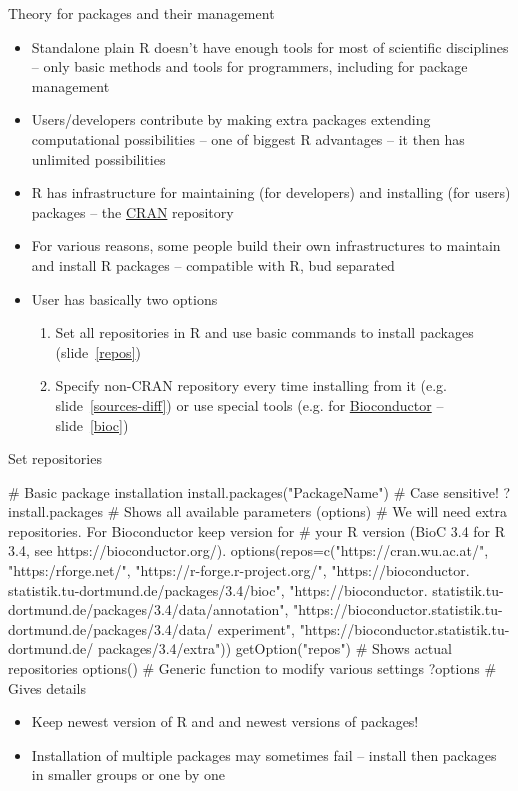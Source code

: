 \documentclass[compress, ucs, xelatex, 11pt, xcolor=svgnames,
  hyperref={
    bookmarks=true,
    unicode=true,
    colorlinks=true,
    pdftitle={Molecular data in R},
    plainpages=false,
    pdfauthor={Vojtech Zeisek},
    pdfsubject={Course about phylogeny and evolution in R},
    pdfcreator={XeLaTeX},
    pdfkeywords={R, evolution, phylogeny, molecular data},
    linkcolor=Tomato,
    anchorcolor=SaddleBrown,
    citecolor=Goldenrod,
    filecolor=DarkMagenta,
    menucolor=Sienna,
    urlcolor=DarkTurquoise,
    pdftex},
  url={hyphens, lowtilde} %
  ]{beamer}
\begin{document}
\begin{frame}{Theory for packages and their management}
  \begin{itemize}
    \item Standalone plain R doesn't have enough tools for most of scientific disciplines -- only basic methods and tools for programmers, including for package management
    \item Users/developers contribute by making extra packages extending computational possibilities -- one of biggest R advantages -- it then has unlimited possibilities
    \item R has infrastructure for maintaining (for developers) and installing (for users) packages -- the \href{https://cran.r-project.org/}{CRAN} repository
    \item For various reasons, some people build their own infrastructures to maintain and install R packages -- compatible with R, bud separated
    \item User has basically two options
    \begin{enumerate}
      \item Set all repositories in R and use basic commands to install packages (slide~\ref{repos})
      \item Specify non-CRAN repository every time installing from it (e.g. slide~\ref{sources-diff}) or use special tools (e.g. for \href{http://bioconductor.org/install/}{Bioconductor} -- slide~\ref{bioc})
    \end{enumerate}
  \end{itemize}
\end{frame}

\begin{frame}[fragile]{Set repositories}
  \label{repos}
  \begin{spluscode}
    # Basic package installation
    install.packages("PackageName") # Case sensitive!
    ?install.packages # Shows all available parameters (options)
    # We will need extra repositories. For Bioconductor keep version for
    # your R version (BioC 3.4 for R 3.4, see https://bioconductor.org/).
    options(repos=c("https://cran.wu.ac.at/", "https:/rforge.net/",
      "https://r-forge.r-project.org/", "https://bioconductor.
      statistik.tu-dortmund.de/packages/3.4/bioc", "https://bioconductor.
      statistik.tu-dortmund.de/packages/3.4/data/annotation", 
      "https://bioconductor.statistik.tu-dortmund.de/packages/3.4/data/
      experiment", "https://bioconductor.statistik.tu-dortmund.de/
      packages/3.4/extra"))
    getOption("repos") # Shows actual repositories
    options() # Generic function to modify various settings
    ?options # Gives details
  \end{spluscode}
  \begin{itemize}
    \item \alert{Keep newest version of R and and newest versions of packages!}
    \item Installation of multiple packages may sometimes fail -- install then packages in smaller groups or one by one
  \end{itemize}
\end{frame}
\end{document}

